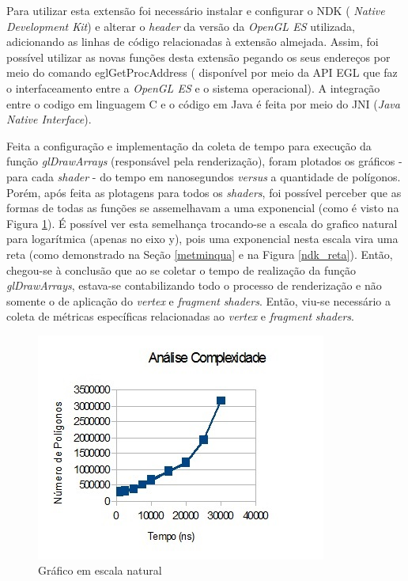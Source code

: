 	Para utilizar esta extensão foi necessário instalar e configurar o NDK ( \textit{Native Development Kit}) e alterar o \textit{header} da versão da \textit{OpenGL ES} utilizada, adicionando as linhas de código relacionadas à extensão almejada. Assim, foi possível utilizar as novas funções desta extensão pegando os seus endereços por meio do comando eglGetProcAddress ( disponível por meio da API EGL que faz o interfaceamento entre a \textit{OpenGL ES} e o sistema operacional). A integração entre o codigo em linguagem C e o código em Java é feita por meio do JNI (\textit{Java Native Interface}).

	Feita a configuração e implementação da coleta de tempo para execução da função \textit{glDrawArrays} (responsável pela renderização), foram plotados os gráficos - para cada \textit{shader} - do tempo em nanosegundos \textit{versus} a quantidade de polígonos. Porém, após feita as plotagens para todos os \textit{shaders}, foi possível perceber que as formas de todas as funções se assemelhavam a uma exponencial (como é visto na Figura  \ref{ndk_exp}). É possível ver esta semelhança trocando-se a escala do grafico natural para logarítmica (apenas no eixo y), pois uma exponencial nesta escala vira uma reta (como demonstrado na Seção \ref{metminqua} e na  Figura  \ref{ndk_reta}). Então, chegou-se à conclusão que ao se coletar o tempo de realização da função \textit{glDrawArrays}, estava-se contabilizando todo o processo de renderização e não somente o de aplicação do \textit{vertex} e  \textit{fragment}  \textit{shaders}. Então, viu-se necessário a coleta de métricas específicas relacionadas ao \textit{vertex} e \textit{fragment} \textit{shaders}. 

	\begin{figure}[h]
	\centering
		\includegraphics[keepaspectratio=true,scale=1.0]{figuras/ndk_exp.jpg}
	\caption{Gráfico em escala natural}
	\label{ndk_exp}
	\end{figure}

